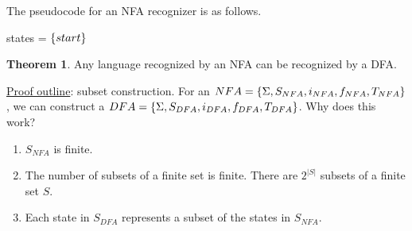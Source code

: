 \documentclass[]{article}
\DeclarePairedDelimiter{\set}{\lbrace}{\rbrace}
\theoremstyle{definition}
\newtheorem*{theorem}{Theorem}
\begin{document}
			The pseudocode for an NFA recognizer is as follows. \\
			\begin{algorithm}[H]
				states = $\set{start}$\;
			\end{algorithm}

			\begin{theorem}
				Any language recognized by an NFA can be recognized by a DFA.
			\end{theorem}

			\underline{Proof outline}: subset construction. For an $NFA = \set{\Sigma, S_{NFA}, i_{NFA}, f_{NFA}, T_{NFA}}$, we can construct a $DFA = \set{\Sigma, S_{DFA}, i_{DFA}, f_{DFA}, T_{DFA}}$. Why does this work?
			\begin{enumerate}
				\item $S_{NFA}$ is finite.
				\item The number of subsets of a finite set is finite. There are $2^{|S|}$ subsets of a finite set $S$.
				\item Each state in $S_{DFA}$ represents a subset of the states in $S_{NFA}$.
			\end{enumerate}
\end{document}
